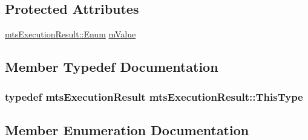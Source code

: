 \subsection*{Protected Attributes}
\begin{DoxyCompactItemize}
\item 
\hyperlink{classmts_execution_result_a10c4246c82ac99d88e5f716f79407b77}{mts\+Execution\+Result\+::\+Enum} \hyperlink{classmts_execution_result_a0b60b355759b76735da6062d9867ff85}{m\+Value}
\end{DoxyCompactItemize}


\subsection{Member Typedef Documentation}
\hypertarget{classmts_execution_result_a8b0081f3c70da65307a17faace94b176}{}
\subsubsection[{This\+Type}]{\setlength{\rightskip}{0pt plus 5cm}typedef {\bf mts\+Execution\+Result} {\bf mts\+Execution\+Result\+::\+This\+Type}}\label{classmts_execution_result_a8b0081f3c70da65307a17faace94b176}


\subsection{Member Enumeration Documentation}
\hypertarget{classmts_execution_result_a10c4246c82ac99d88e5f716f79407b77}{}
